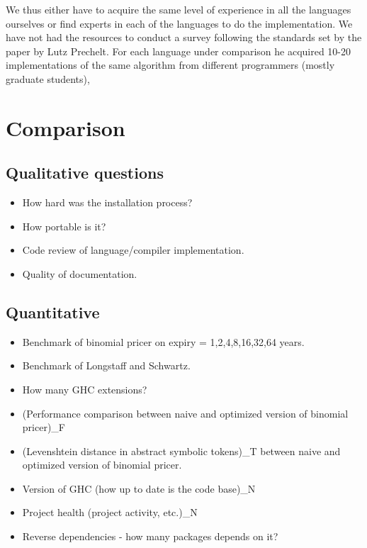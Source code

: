 We thus either have to acquire the same level of experience in all the
languages ourselves or find experts in each of the languages to do the
implementation. We have not had the resources to conduct a survey
following the standards set by the paper by Lutz Prechelt. For each
language under comparison he acquired 10-20 implementations of the
same algorithm from different programmers (mostly graduate students),


\section{Comparison}

\subsection{Qualitative questions}
\begin{itemize}
\item How hard was the installation process?
\item How portable is it?
\item Code review of language/compiler implementation.
\item Quality of documentation.
\end{itemize}
\subsection{Quantitative}
\begin{itemize}
\item Benchmark of binomial pricer on expiry = 1,2,4,8,16,32,64 years.
\item Benchmark of Longstaff and Schwartz.
\item How many GHC extensions?
\item (Performance comparison between naive and optimized version of
  binomial pricer)\_F
\item (Levenshtein distance in abstract symbolic tokens)\_T between
  naive and optimized version of binomial pricer.
\item Version of GHC (how up to date is the code base)\_N
\item Project health (project activity, etc.)\_N
\item Reverse dependencies - how many packages
  depends on it?
\end{itemize}

